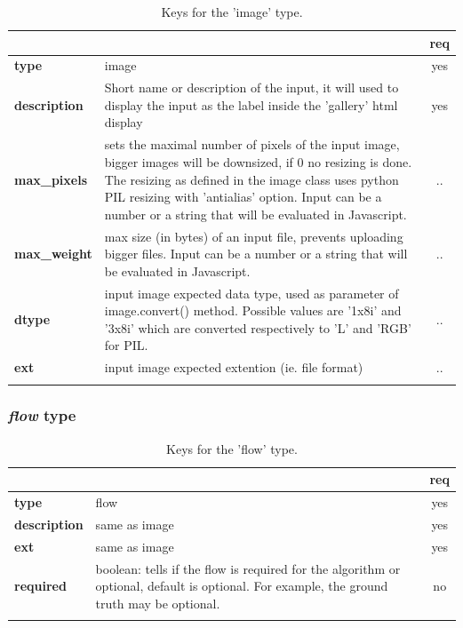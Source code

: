 \begin{longtable}{|>{\bf}L{\linewidth}|L{\linewidth}|c|}
\hline
{}     &  & {\bf req} \tabularnewline 
\hline \hline
 type         & image & yes \\ \hline
 description  & Short name or description of the input, it will used to display 
the input as the label inside the 'gallery' html display & yes \\ \hline
 max\_pixels   &  sets the maximal number of pixels of the input image, 
bigger images will be downsized, if 0 no resizing is done. The resizing as 
defined in the image class uses python PIL resizing with 'antialias' option. 
Input can be a number or a string that will be evaluated in Javascript.  & .. \\ \hline
 max\_weight   & max size (in bytes) of an input file, prevents uploading 
bigger files. Input can be a number or a string that will be evaluated in Javascript. & .. \\ \hline
 dtype        & input image expected data type, used as parameter of 
image.convert() method. Possible values are '1x8i' and '3x8i' which are 
converted respectively to 'L' and 'RGB' for PIL. & .. \\ \hline
 ext          & input image expected extention (ie. file format) & .. \\ \hline
\caption{Keys for the 'image' type.}
\end{longtable}

\subsubsection{\emph{flow} type}



\begin{longtable}{|>{\bf}L{\linewidth}|L{\linewidth}|c|}
\hline
{}     &  & {\bf req} \tabularnewline 
\hline \hline
 type             & flow & yes \\ \hline
 description      & same as image & yes \\ \hline
 ext              & same as image & yes \\ \hline
 required         & boolean: tells if the flow is required for the algorithm
or optional, default is optional. For example, the ground truth may be optional.& no \\ \hline
\caption{Keys for the 'flow' type.}
\end{longtable}


